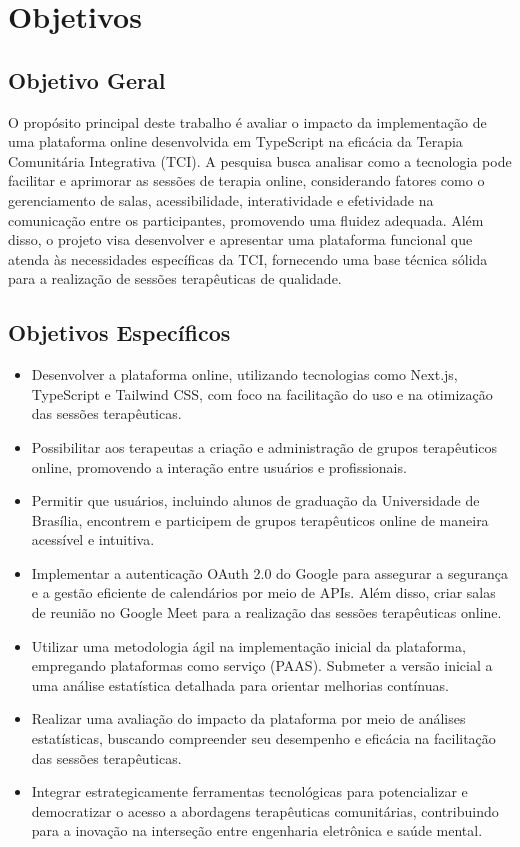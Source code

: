 \chapter*[Objetivos]{Objetivos}
\section*{Objetivo Geral}
O propósito principal deste trabalho é avaliar o impacto da implementação de uma plataforma online desenvolvida em TypeScript na eficácia da Terapia Comunitária Integrativa (TCI). A pesquisa busca analisar como a tecnologia pode facilitar e aprimorar as sessões de terapia online, considerando fatores como o gerenciamento de salas, acessibilidade, interatividade e efetividade na comunicação entre os participantes, promovendo uma fluidez adequada. Além disso, o projeto visa desenvolver e apresentar uma plataforma funcional que atenda às necessidades específicas da TCI, fornecendo uma base técnica sólida para a realização de sessões terapêuticas de qualidade.

\section*{Objetivos Específicos}
\begin{itemize}
        \item Desenvolver a plataforma online, utilizando tecnologias como Next.js, TypeScript e Tailwind CSS, com foco na facilitação do uso e na otimização das sessões terapêuticas.
      \item Possibilitar aos terapeutas a criação e administração de grupos terapêuticos online, promovendo a interação entre usuários e profissionais.
        \item Permitir que usuários, incluindo alunos de graduação da Universidade de Brasília, encontrem e participem de grupos terapêuticos online de maneira acessível e intuitiva.
       \item Implementar a autenticação OAuth 2.0 do Google para assegurar a segurança e a gestão eficiente de calendários por meio de APIs. Além disso, criar salas de reunião no Google Meet para a realização das sessões terapêuticas online.
       \item Utilizar uma metodologia ágil na implementação inicial da plataforma, empregando plataformas como serviço (PAAS). Submeter a versão inicial a uma análise estatística detalhada para orientar melhorias contínuas.
        \item Realizar uma avaliação do impacto da plataforma por meio de análises estatísticas, buscando compreender seu desempenho e eficácia na facilitação das sessões terapêuticas.
        \item Integrar estrategicamente ferramentas tecnológicas para potencializar e democratizar o acesso a abordagens terapêuticas comunitárias, contribuindo para a inovação na interseção entre engenharia eletrônica e saúde mental.
      \end{itemize}

